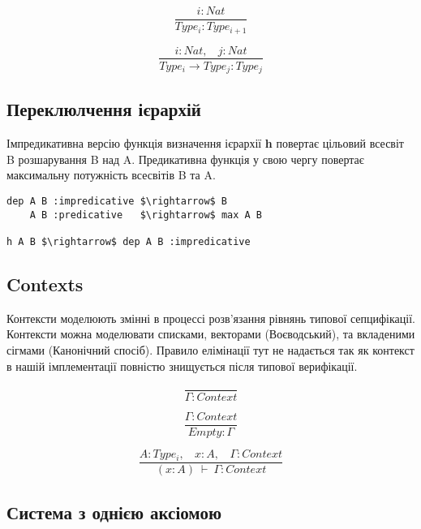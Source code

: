 \documentclass{article}
\begin{document}
\begin{equation}
\tag{$A_2$}
\dfrac
{i: Nat}
{Type_i : Type_{i+1}}
\end{equation}

\begin{equation}
\tag{$R_2$}
\dfrac
{i : Nat,\ \ \ \ j : Nat}
{Type_i \rightarrow Type_{j} : Type_{j}}
\end{equation}

\subsection{Переклюлчення ієрархій}
Імпредикативна версію функція визначення ієрархії {\bf h} повертає цільовий всесвіт B розшарування B над A.
Предикативна функція у свою чергу повертає максимальну потужність всесвітів B та A.

\begin{lstlisting}[mathescape=true]
dep A B :impredicative $\rightarrow$ B
    A B :predicative   $\rightarrow$ max A B

h A B $\rightarrow$ dep A B :impredicative
\end{lstlisting}

\subsection{Contexts}

Контексти моделюють змінні в процессі розв'язання рівнянь типової сепцифікації. Контексти можна моделювати
списками, векторами (Воєводський), та вкладеними сігмами (Канонічний спосіб). Правило елімінації тут не надається
так як контекст в нашій імплементації повністю знищується після типової верифікації.

\begin{equation}
\tag{Ctx-formation}
\dfrac
{}
{\Gamma : Context}
\end{equation}

\begin{equation}
\tag{Ctx-intro$_1$}
\dfrac
{\Gamma : Context}
{Empty : \Gamma}
\end{equation}

\begin{equation}
\tag{Ctx-intro$_2$}
\dfrac
{A : Type_i,\ \ \ \ x : A,\ \ \ \ \Gamma : Context}
{(x : A)\ \vdash\ \Gamma : Context}
\end{equation}

\subsection{Система з однією аксіомою}
\end{document}
